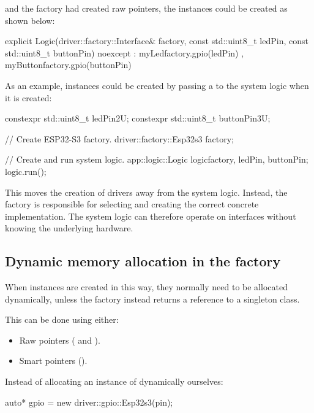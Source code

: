 \noindent and the factory had created raw pointers, the instances could be created as shown below:

\begin{cppcode}
explicit Logic(driver::factory::Interface& factory,
               const std::uint8_t ledPin,
               const std::uint8_t buttonPin) noexcept
        : myLed{factory.gpio(ledPin)}
        , myButton{factory.gpio(buttonPin)}
    {}
\end{cppcode}

\noindent As an example,  instances could be created by passing a
 to the system logic when it is created:

\begin{cppcode}
    constexpr std::uint8_t ledPin{2U};
    constexpr std::uint8_t buttonPin{3U};

    // Create ESP32-S3 factory.
    driver::factory::Esp32s3 factory{};

    // Create and run system logic.
    app::logic::Logic logic{factory, ledPin, buttonPin};
    logic.run();
\end{cppcode}

\noindent This moves the creation of drivers away from the system logic. Instead, the factory is
responsible for selecting and creating the correct concrete implementation. The system logic can
therefore operate on interfaces without knowing the underlying hardware.

\subsection{Dynamic memory allocation in the factory}
\label{c4:sec:dynamic}
When instances are created in this way, they normally need to be allocated dynamically, unless the
factory instead returns a reference to a singleton class.

This can be done using either:
\begin{itemize}
  \item Raw pointers ( and ).
  \item Smart pointers ().
\end{itemize}
Instead of allocating an instance of  dynamically ourselves:

\begin{cppcode}
auto* gpio = new driver::gpio::Esp32s3(pin);
\end{cppcode}

